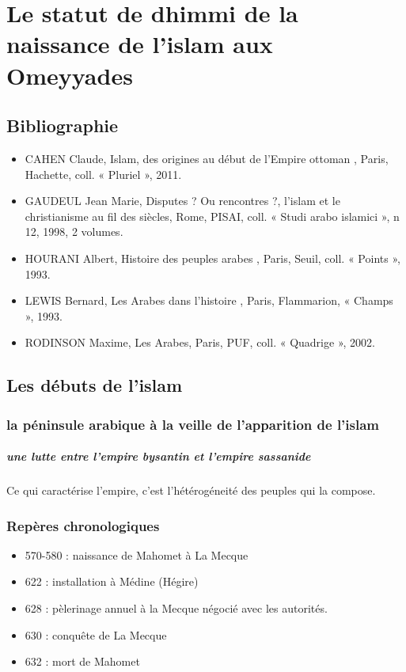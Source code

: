 \chapter{Le statut de dhimmi de la
naissance de l’islam aux Omeyyades}



\section{Bibliographie}

\begin{itemize}
    \item CAHEN Claude,
Islam, des origines au début de l’Empire ottoman , Paris, Hachette, coll. « Pluriel », 2011.
    \item 
GAUDEUL
Jean Marie, Disputes ? Ou rencontres ?, l’islam et le christianisme au fil des siècles, Rome,
PISAI, coll. « Studi arabo islamici », n 12, 1998, 2 volumes.
    \item 
HOURANI Albert,
Histoire des peuples arabes , Paris, Seuil, coll. « Points », 1993.
    \item 
LEWIS Bernard,
Les Arabes dans l’histoire , Paris, Flammarion, « Champs », 1993.
    \item 
RODINSON Maxime,
Les Arabes, Paris, PUF, coll. « Quadrige », 2002.
\end{itemize}


\section{Les débuts de l’islam}

\subsection{la péninsule arabique à la veille de l'apparition de l'islam}

\paragraph{une lutte entre l'empire bysantin et l'empire sassanide}
\begin{Def}[Empire]
Ce qui caractérise l'empire, c'est l'hétérogéneité des peuples qui la compose. 
\end{Def}

 \subsection{Repères chronologiques}
 \begin{itemize}
   \item	570-580 : naissance de Mahomet à La Mecque
\item 	622 : installation à Médine (Hégire)
\item 628 : pèlerinage annuel à la Mecque négocié avec les autorités.
\item 	630 : conquête de La Mecque
\item 	632 : mort de Mahomet
 \end{itemize}

